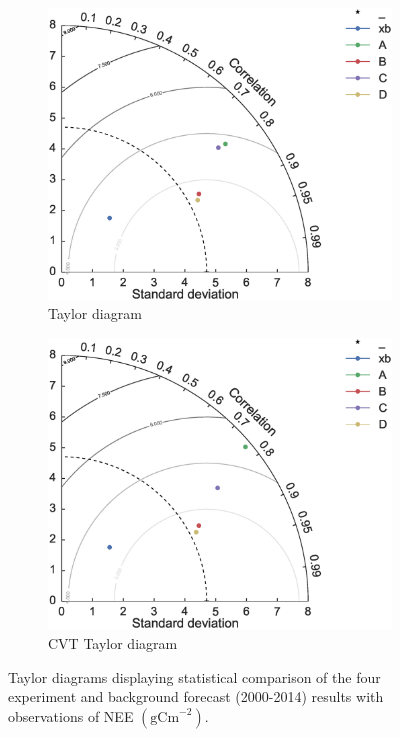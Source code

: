 \documentclass[11pt]{article}
\begin{document}
\begin{figure}[ht]
    \centering
    \begin{subfigure}[b]{0.49\textwidth}
        \includegraphics[width=\textwidth]{td.eps}
        \caption{Taylor diagram}
        \label{fig:forecastscatBR}
    \end{subfigure}
    \begin{subfigure}[b]{0.49\textwidth}
        \includegraphics[width=\textwidth]{td_cvt.eps}
        \caption{CVT Taylor diagram}
        \label{fig:forecastscatedcBR}
    \end{subfigure}
    \caption{Taylor diagrams displaying statistical comparison of the four experiment and background forecast (2000-2014) results with observations of NEE $( \text{gCm}^{-2})$.}
    \label{fig:taylordiag}
\end{figure}
\end{document}
